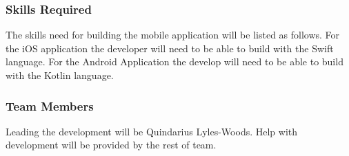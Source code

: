 \documentclass{article}
\begin{document}
\subsubsection{Skills Required}
The skills need for building the mobile application will be listed as follows.
For the iOS application the developer will need to be able to build with the Swift language.
For the Android Application the develop will need to be able to build with the Kotlin language.
\subsubsection{Team Members}
Leading the development will be Quindarius Lyles-Woods.
Help with development will be provided by the rest of team.
\end{document}
